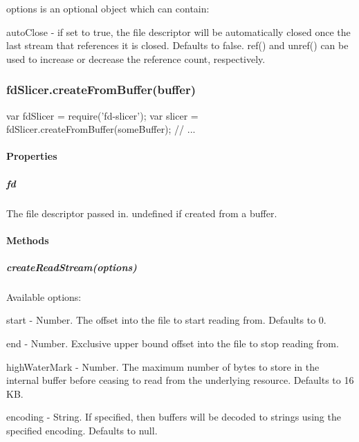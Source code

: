 {\ttfamily options} is an optional object which can contain\+:


\begin{DoxyItemize}
\item {\ttfamily auto\+Close} -\/ if set to {\ttfamily true}, the file descriptor will be automatically closed once the last stream that references it is closed. Defaults to {\ttfamily false}. {\ttfamily ref()} and {\ttfamily unref()} can be used to increase or decrease the reference count, respectively.
\end{DoxyItemize}

\subsubsection*{fd\+Slicer.\+create\+From\+Buffer(buffer)}


\begin{DoxyCode}
var fdSlicer = require('fd-slicer');
var slicer = fdSlicer.createFromBuffer(someBuffer);
// ...
\end{DoxyCode}


\paragraph*{Properties}

\subparagraph*{fd}

The file descriptor passed in. {\ttfamily undefined} if created from a buffer.

\paragraph*{Methods}

\subparagraph*{create\+Read\+Stream(options)}

Available {\ttfamily options}\+:


\begin{DoxyItemize}
\item {\ttfamily start} -\/ Number. The offset into the file to start reading from. Defaults to 0.
\item {\ttfamily end} -\/ Number. Exclusive upper bound offset into the file to stop reading from.
\item {\ttfamily high\+Water\+Mark} -\/ Number. The maximum number of bytes to store in the internal buffer before ceasing to read from the underlying resource. Defaults to 16 KB.
\item {\ttfamily encoding} -\/ String. If specified, then buffers will be decoded to strings using the specified encoding. Defaults to {\ttfamily null}.
\end{DoxyItemize}

